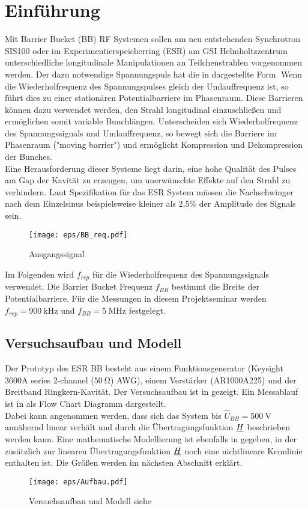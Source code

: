 \documentclass[../Report.tex]{subfiles}
\begin{document}
\chapter{Einführung}
\label{chap:einfuehrung}
Mit Barrier Bucket (BB) RF Systemen sollen am neu entstehenden Synchrotron SIS100 oder im Experimentier\-speicherring (ESR) am GSI Helmholtzzentrum unterschiedliche longitudinale Manipulationen an Teilchenstrahlen vorgenommen werden. Der dazu notwendige Spannungspuls hat die in  dargestellte Form. Wenn die Wiederholfrequenz des Spannungspulses gleich der Umlauffrequenz ist, so führt dies zu einer stationären Potentialbarriere im Phasenraum. Diese Barrieren können dazu verwendet werden, den Strahl longitudinal einzuschließen und ermöglichen somit variable Bunch\-längen. Unterscheiden sich Wiederholfrequenz des Spannungssignals und Umlauffrequenz, so bewegt sich die Barriere im Phasenraum ("moving barrier") und ermöglicht Kompression und Dekompression der Bunches.
\\ 
Eine Herausforderung dieser Systeme liegt darin, eine hohe Qualität des Pulses am Gap der Kavität zu erzeugen, um unerwünschte Effekte auf den Strahl zu verhindern. Laut Spezifikation für das ESR System müssen die Nachschwinger nach dem Einzelsinus beispielsweise kleiner als 2,5\% der Amplitude des Signals sein.
\begin{figure}[H]
  \centering
  \texttt{[image: eps/BB\_req.pdf]}
  \caption{Ausgangssignal}
  \label{fig:BB_req}
\end{figure}
\noindent
Im Folgenden wird $f_{rep}$ für die Wiederholfrequenz des Spannungssignals verwendet. Die Barrier Bucket Frequenz $f_{BB}$ bestimmt die Breite der Potentialbarriere. Für die Messungen in diesem Projektseminar werden $f_{rep} = \SI{900}{\kilo\hertz}$ und $f_{BB} = \SI{5}{\mega \hertz}$ festgelegt.


\section[Modell und Konvention]{Versuchsaufbau und Modell}
\label{sec:einf.modell_BB}
Der Prototyp des ESR BB besteht aus einem Funktionsgenerator (Keysight 3600A series 2-channel ($\SI{50}{\ohm}$) AWG), einem Verstärker (AR1000A225) und der Breitband Ringkern-Kavität. Der Versuchsaufbau ist in  gezeigt. Ein Messablauf ist in  als Flow Chart Diagramm dargestellt.\\
Dabei kann angenommen werden, dass sich das System bis $\hat{U}_{BB} = \SI{500}{\volt}$ annähernd linear verhält und durch die Übertragungsfunktion $\underline{H}$ beschrieben werden kann. Eine mathematische Modellierung ist ebenfalls in  gegeben, in der zusätzlich zur linearen Übertragungsfunktion $\underline{H}$ noch eine nichtlineare Kennlinie enthalten ist. Die Größen werden im nächsten Abschnitt erklärt.
\begin{figure}[H]
	\centering
	\texttt{[image: eps/Aufbau.pdf]}
	\caption{Versuchsaufbau und Modell siehe \cite{harzheim}}
  	\label{fig:Aufbau}
\end{figure}
\end{document}
